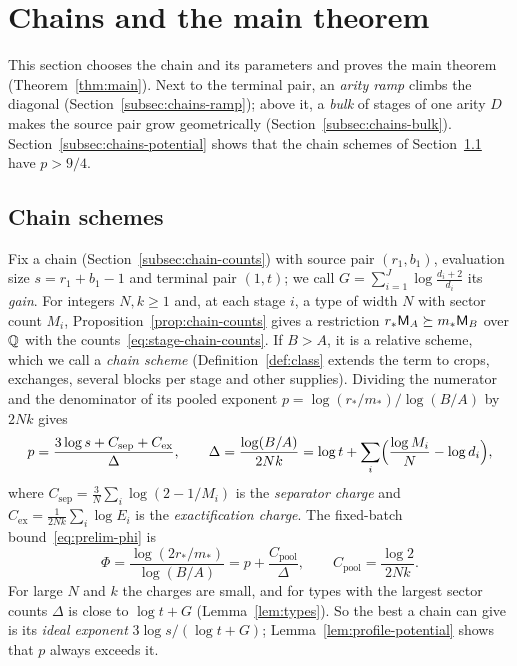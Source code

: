 \section{Chains and the main theorem}
\label{sec:chains}

This section chooses the chain and its parameters and proves the main
theorem (Theorem~\ref{thm:main}). Next to the terminal pair, an
\emph{arity ramp} climbs the diagonal (Section~\ref{subsec:chains-ramp});
above it, a \emph{bulk} of stages of one arity \(D\) makes the source
pair grow geometrically (Section~\ref{subsec:chains-bulk}).
Section~\ref{subsec:chains-potential} shows that the chain schemes of
Section~\ref{subsec:chains-legal} have \(p>9/4\).

\subsection{Chain schemes}
\label{subsec:chains-legal}

Fix a chain (Section~\ref{subsec:chain-counts}) with source pair
\((r_1,b_1)\), evaluation size \(s=r_1+b_1-1\) and terminal pair
\((1,t)\); we call \(G=\sum_{i=1}^J\log\frac{d_i+2}{d_i}\) its
\emph{gain}. For integers \(N,k\ge1\) and, at each stage \(i\), a type
of width \(N\) with sector count \(M_i\), Proposition~\ref{prop:chain-counts} gives a
restriction \(r_*\mathsf M_A\succeq m_*\mathsf M_B\) over \(\mathbb Q\) with the
counts~\eqref{eq:stage-chain-counts}. If \(B>A\), it is a relative
scheme, which we call a \emph{chain scheme}
(Definition~\ref{def:class} extends the term to crops, exchanges,
several blocks per stage and other supplies). Dividing the numerator and
the denominator of its pooled exponent \(p=\log(r_*/m_*)/\log(B/A)\) by
\(2Nk\) gives
\begin{equation}\label{eq:p-normalized}
 p=\frac{3\log s+C_{\mathrm{sep}}+C_{\mathrm{ex}}}{\Delta},\qquad
 \Delta=\frac{\log(B/A)}{2Nk}
 =\log t+\sum_i\Bigl(\frac{\log M_i}N-\log d_i\Bigr),
\end{equation}
where \(C_{\mathrm{sep}}=\frac3N\sum_i\log(2-1/M_i)\) is the
\emph{separator charge} and
\(C_{\mathrm{ex}}=\frac1{2Nk}\sum_i\log E_i\) is the
\emph{exactification charge}. The fixed-batch bound~\eqref{eq:prelim-phi} is
\begin{equation}\label{eq:chains-phi}
 \Phi=\frac{\log(2r_*/m_*)}{\log(B/A)}=p+\frac{C_{\mathrm{pool}}}{\Delta},
 \qquad C_{\mathrm{pool}}=\frac{\log2}{2Nk}.
\end{equation}
For large \(N\) and \(k\) the charges are small, and for types with the
largest sector counts \(\Delta\) is close to \(\log t+G\)
(Lemma~\ref{lem:types}). So the best a chain can give is its
\emph{ideal exponent} \(3\log s/(\log t+G)\);
Lemma~\ref{lem:profile-potential} shows that \(p\) always exceeds it.

